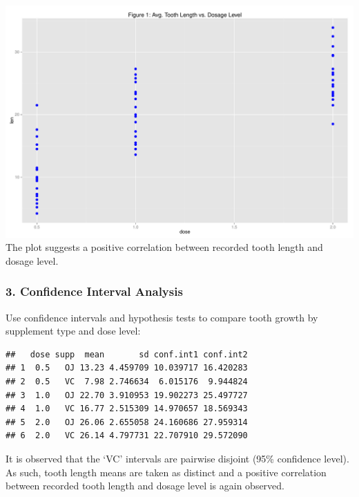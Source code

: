 \documentclass[]{article}
\newenvironment{Shaded}{\begin{snugshade}}{\end{snugshade}}
\newcommand{\KeywordTok}[1]{\textcolor[rgb]{0.13,0.29,0.53}{\textbf{{#1}}}}
\newcommand{\DataTypeTok}[1]{\textcolor[rgb]{0.13,0.29,0.53}{{#1}}}
\newcommand{\StringTok}[1]{\textcolor[rgb]{0.31,0.60,0.02}{{#1}}}
\newcommand{\NormalTok}[1]{{#1}}
\begin{document}
\includegraphics{figure/unnamed-chunk-3-1.pdf} The plot suggests a
positive correlation between recorded tooth length and dosage level.

\subsubsection{3. Confidence Interval
Analysis}\label{confidence-interval-analysis}

Use confidence intervals and hypothesis tests to compare tooth growth by
supplement type and dose level:

\begin{Shaded}
\end{Shaded}

\begin{verbatim}
##   dose supp  mean       sd conf.int1 conf.int2
## 1  0.5   OJ 13.23 4.459709 10.039717 16.420283
## 2  0.5   VC  7.98 2.746634  6.015176  9.944824
## 3  1.0   OJ 22.70 3.910953 19.902273 25.497727
## 4  1.0   VC 16.77 2.515309 14.970657 18.569343
## 5  2.0   OJ 26.06 2.655058 24.160686 27.959314
## 6  2.0   VC 26.14 4.797731 22.707910 29.572090
\end{verbatim}

It is observed that the `VC' intervals are pairwise disjoint (95\%
confidence level). As such, tooth length means are taken as distinct and
a positive correlation between recorded tooth length and dosage level is
again observed.
\end{document}
